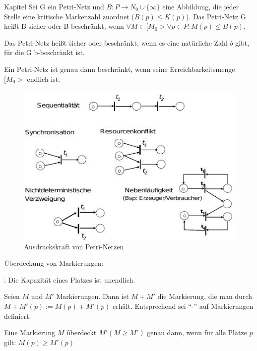 \begin{chapter}{Kapitel}
\noindent Sei G ein Petri-Netz und $B:P\rightarrow N_0 \cup \{\infty\}$ eine Abbildung, die jeder Stelle eine kritische Markenzahl zuordnet ($B(p)\leq K(p)$). 
Das Petri-Netz G heißt \f{B-sicher} oder \f{B-beschränkt}, wenn $ \forall M\in[M_0>\forall p\in P:M(p)\leq B(p)$.
\vspace*{6pt}

\noindent Das Petri-Netz heißt \f{sicher} oder \f{beschränkt}, wenn es eine natürliche Zahl $b$ gibt, für die G b-beschränkt ist. 
\vspace*{6pt}

\noindent Ein Petri-Netz ist genau dann beschränkt, wenn seine Erreichbarkeitsmenge $[M_0>$ endlich ist.
\vspace*{6pt}

\begin{figure}[!ht]
 \centering
 \includegraphics[scale=0.7]{pics/ausdruckPetrinetze}
 \caption{Ausdruckskraft von Petri-Netzen}
\end{figure}

\f{Überdeckung von Markierungen}:
\vspace*{4pt}

\noindent {}: Die Kapazität eines Platzes ist unendlich. 
\vspace*{4pt}

\noindent Seien $M$ und $M'$ Markierungen. Dann ist $M+M'$ die Markierung, die man durch $M+M'(p) := M(p)+M'(p)$ erhält. Entsprechend sei ``-'' auf Markierungen 
definiert. 
\vspace*{4pt}

\noindent Eine Markierung $M$ \f{überdeckt} $M'(M\geq M')$ genau dann, wenn für alle Plätze $p$ gilt: $M(p)\geq M'(p)$
\vspace*{6pt}


\end{chapter}
